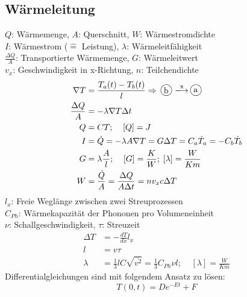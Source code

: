 \documentclass[a4paper,twocolumn,10pt]{article}
\newcommand*\kreis[1]{\unitlength1ex\begin{picture}(2.5,2.5)%
\put(0.75,0.75){\circle{3}}\put(0.7,0.7){\makebox(0,0){#1}}\end{picture}}
\begin{document}
\subsection{Wärmeleitung}
$Q$: Wärmemenge, $A$: Querschnitt, $W$: Wärmestromdichte\\
$I$: Wärmestrom ($\widehat{=}$ Leistung), $\lambda$: Wärmeleitfähigkeit\\
$\frac{\Delta Q}{A}$: Transportierte Wärmemenge, $G$: Wärmeleitwert\\
$v_x$: Geschwindigkeit in x-Richtung, $n$: Teilchendichte
\begin{equation*}
\begin{split}
\nabla T&=\frac{T_a(t)-T_b(t)}{l}\Rightarrow\;\;\kreis{b}\xlongrightarrow{\text{x}} \;\kreis{a}\\
\frac{\Delta Q}{A}&=-\lambda \nabla T\Delta t\\
Q&=CT;\;\;\;\;[Q]=J\\
I&=\dot{Q}=-\lambda A\nabla T=G\Delta T=C_a\dot{T}_a=-C_b\dot{T}_b\\
G&=\lambda\frac{A}{l};\;\;\;\;[G]=\frac{K}{W};\;[\lambda]=\frac{W}{Km}\\
W&=\frac{\dot{Q}}{A}=\frac{\Delta Q}{A\Delta t}=nv_x c\Delta T\\
\end{split}
\end{equation*}
$l_x$: Freie Weglänge zwischen zwei Streuprozessen\\
$C_{Ph}$: Wärmekapazität der Phononen pro Volumeneinheit\\
$\nu$: Schallgeschwindigkeit, $\tau$: Streuzeit\\
\begin{equation*}
\begin{split}
\Delta T&=-\frac{dT}{dx}l_x\\
l&=v\tau\\
\lambda&=\frac{1}{3}lC\sqrt{\overline{v^2}}=\frac{1}{3}C_{Ph}\nu l;\;\;\;\;[\lambda]=\frac{W}{Km}
\end{split}
\end{equation*}
Differentialgleichungen sind mit folgendem Ansatz zu lösen:
\begin{equation*}
T(0,t)=De^{-Et}+F
\end{equation*}
\end{document}
